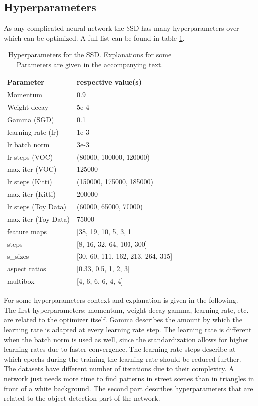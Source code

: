 \subsection{Hyperparameters}

As any complicated neural network the SSD has many hyperparameters over which can be optimized. A full list can be found in table \ref{table:hyperparameters}.

\begin{table}[!htb]
	\centering
	\caption{Hyperparameters for the SSD. Explanations for some Parameters are given in the accompanying text.}
	\begin{tabularx}{\textwidth}{ X  X}
		\hline
		Parameter & respective value(s) \\
		\hline
		Momentum & 0.9 \\ 
		Weight decay & 5e-4\\
		Gamma (SGD) & 0.1 \\
		learning rate (lr) & 1e-3 \\
		lr batch norm & 3e-3 \\
		lr steps (VOC) & (80000, 100000, 120000) \\
		max iter (VOC) & 125000 \\
		lr steps (Kitti)& (150000, 175000, 185000) \\
		max iter (Kitti) & 200000 \\
		lr steps (Toy Data) & (60000, 65000, 70000) \\
		max iter (Toy Data) & 75000 \\
		\hline
		feature maps & [38, 19, 10, 5, 3, 1] \\
		steps & [8, 16, 32, 64, 100, 300] \\
		s\_sizes & [30, 60, 111, 162, 213, 264, 315] \\
		aspect ratios & [0.33, 0.5, 1, 2, 3] \\
		multibox & [4, 6, 6, 6, 4, 4] \\
		\hline
	\end{tabularx}
	\label{table:hyperparameters}
\end{table}
For some hyperparameters context and explanation is given in the following. \\
The first hyperparameters: momentum, weight decay gamma, learning rate, etc. are related to the optimizer itself. Gamma describes the amount by which the learning rate is adapted at every learning rate step. The learning rate is different when the batch norm is used as well, since the standardization allows for higher learning rates due to faster convergence. The learning rate steps describe at which epochs during the training the learning rate should be reduced further. The datasets have different number of iterations due to their complexity. A network just needs more time to find patterns in street scenes than in triangles in front of a white background. The second part describes hyperparameters that are related to the object detection part of the network. 
